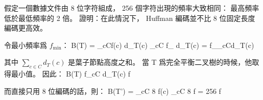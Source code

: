\startEXERCISE
假定一個數據文件由 8 位字符組成，
 256 個字符出現的頻率大致相同：
最高頻率低於最低頻率的 2 倍。
證明：在此情況下， Huffman 編碼並不比 8 位固定長度編碼更高效。
\stopEXERCISE

\startANSWER
令最小頻率爲 $f_{\min}$：
\startformula
B(T) = \sum_{c\in C}f(c) d_{T}(c)
     \ge \sum_{c\in C} f_{\min} \times d_{T}(c)
     = f_{\min}\times\sum_{c\in C}d_{T}(c)
\stopformula

其中 $\sum_{c\in C}d_{T}(c)$ 是葉子節點高度之和。
當 T 爲完全平衡二叉樹的時候，他取得最小值。
因此：
\startformula
B(T) \ge f\times \sum_{c\in C} d_{T}(c)
     \ge f 
\stopformula

而直接只用 8 位編碼的話，則：
\startformula
B(T') = \sum_{c\in C} 8 \times f(c)
      \le \sum_{c\in C} 8  \times f
      = 256   \times f
\stopformula
\stopANSWER
